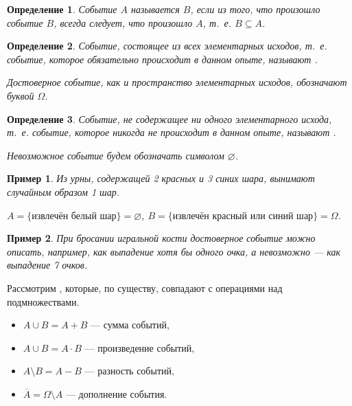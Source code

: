 \documentclass[a4paper]{report}
\theoremstyle{indented}
\newtheorem{definition}{Определение}[section]
\newtheorem{example}{Пример}[section]
\begin{document}
\begin{definition}
	\label{def:consequence-of-the-event}
	Событие $A$ называется  $B$, если из того, что произошло событие $B$, всегда следует, что произошло $A$, т.~е. $B\subseteq A$.
\end{definition}

\begin{definition}
	\label{def:certain-event}
	Событие, состоящее из всех элементарных исходов, т.~е. событие, которое обязательно происходит в данном опыте, называют .

	Достоверное событие, как и пространство элементарных исходов, обозначают буквой $\Omega$.
\end{definition}


\begin{definition}
	\label{def:impossible-event}
	Событие, не содержащее ни одного элементарного исхода, т.~е. событие, которое никогда не происходит в данном опыте, называют .

	Невозможное событие будем обозначать символом $\varnothing$.
\end{definition}

\begin{example}
	\label{xmp:event-balls}
	Из урны, содержащей 2 красных и 3 синих шара, вынимают случайным образом 1 шар.

	$A = \{ \text{извлечён белый шар} \} = \varnothing$,
	$B = \{ \text{извлечён красный или синий шар} \} = \Omega$.
\end{example}

\begin{example}
	\label{xmp:event-dice-toss}
	При бросании игральной кости достоверное событие можно описать, например, как выпадение хотя бы одного очка, а невозможно — как выпадение 7 очков.
\end{example}

Рассмотрим , которые, по существу, совпадают с операциями над подмножествами.
\begin{itemize}
	\item $A \cup B = A + B$ — сумма событий,
	\item $A \cup B = A \cdot B$ — произведение событий,
	\item $A \setminus B = A - B $ — разность событий,
	\item $\overline A = \Omega \setminus A$ — дополнение события.
\end{itemize}
\end{document}
